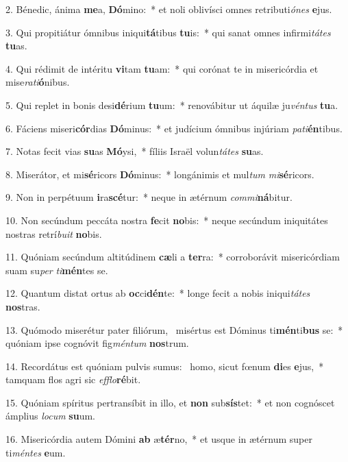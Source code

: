 2. Bénedic, ánima \textbf{me}a, \textbf{Dó}mino:~*  et noli oblivísci omnes retributi\textit{ó}\textit{nes} \textbf{e}jus.\

3. Qui propitiátur ómnibus iniqui\textbf{tá}tibus \textbf{tu}is:~*  qui sanat omnes infirmi\textit{tá}\textit{tes} \textbf{tu}as.\

4. Qui rédimit de intéritu \textbf{vi}tam \textbf{tu}am:~*  qui corónat te in misericórdia et mise\textit{ra}\textit{ti}\textbf{ó}nibus.\

5. Qui replet in bonis desi\textbf{dé}rium \textbf{tu}um:~*  renovábitur ut áquilæ ju\textit{vén}\textit{tus} \textbf{tu}a.\

6. Fáciens miseri\textbf{cór}dias \textbf{Dó}minus:~*  et judícium ómnibus injúriam \textit{pa}\textit{ti}\textbf{én}tibus.\

7. Notas fecit vias \textbf{su}as \textbf{Mó}ysi,~*  fíliis Israël volun\textit{tá}\textit{tes} \textbf{su}as.\

8. Miserátor, et mi\textbf{sé}ricors \textbf{Dó}minus:~*  longánimis et mul\textit{tum} \textit{mi}\textbf{sé}ricors.\

9. Non in perpétuum \textbf{i}ra\textbf{scé}tur:~*  neque in ætérnum \textit{com}\textit{mi}\textbf{ná}bitur.\

10. Non secúndum peccáta nostra \textbf{fe}cit \textbf{no}bis:~*  neque secúndum iniquitátes nostras retrí\textit{bu}\textit{it} \textbf{no}bis.\

11. Quóniam secúndum altitúdinem \textbf{cæ}li a \textbf{ter}ra:~*  corroborávit misericórdiam suam su\textit{per} \textit{ti}\textbf{mén}tes se.\

12. Quantum distat ortus ab \textbf{oc}ci\textbf{dén}te:~*  longe fecit a nobis iniqui\textit{tá}\textit{tes} \textbf{nos}tras.\

13. Quómodo miserétur pater filiórum, \dag\  misértus est Dóminus ti\textbf{mén}ti\textbf{bus} se:~*  quóniam ipse cognóvit fig\textit{mén}\textit{tum} \textbf{nos}trum.\

14. Recordátus est quóniam pulvis sumus: \dag\  homo, sicut fœnum \textbf{di}es \textbf{e}jus,~*  tamquam flos agri sic \textit{ef}\textit{flo}\textbf{ré}bit.\

15. Quóniam spíritus pertransíbit in illo, et \textbf{non} sub\textbf{sís}tet:~*  et non cognóscet ámplius \textit{lo}\textit{cum} \textbf{su}um.\

16. Misericórdia autem Dómini \textbf{ab} æ\textbf{tér}no,~*  et usque in ætérnum super ti\textit{mén}\textit{tes} \textbf{e}um.\

